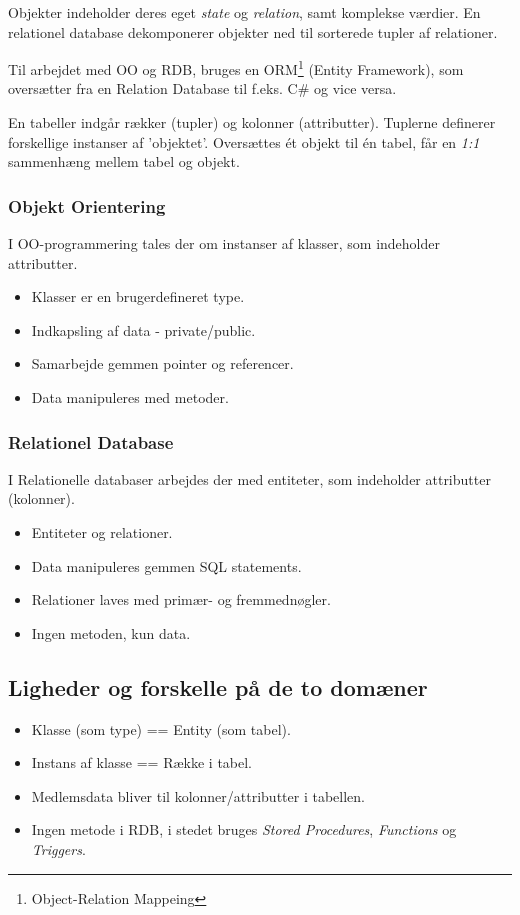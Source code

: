 Objekter indeholder deres eget \textit{state} og \textit{relation}, samt komplekse værdier. En relationel database dekomponerer objekter ned til sorterede tupler af relationer.

Til arbejdet med OO og RDB, bruges en ORM\footnote{Object-Relation Mappeing} (Entity Framework), som oversætter fra en Relation Database til f.eks. C\# og vice versa.

En tabeller indgår rækker (tupler) og kolonner (attributter). 
Tuplerne definerer forskellige instanser af 'objektet'. Oversættes ét objekt til én tabel, får en \textit{1:1} sammenhæng mellem tabel og objekt.

\subsubsection{Objekt Orientering}
I OO-programmering tales der om instanser af klasser, som indeholder attributter.

\begin{itemize}
	\item Klasser er en brugerdefineret type.
	\item Indkapsling af data - private/public.
	\item Samarbejde gemmen pointer og referencer.
	\item Data manipuleres med metoder.
\end{itemize}

\subsubsection{Relationel Database}
I Relationelle databaser arbejdes der med entiteter, som indeholder attributter (kolonner).

\begin{itemize}
	\item Entiteter og relationer.
	\item Data manipuleres gemmen SQL statements.
	\item Relationer laves med primær- og fremmednøgler.
	\item Ingen metoden, kun data.
\end{itemize}

\subsection{Ligheder og forskelle på de to domæner}

\begin{itemize}
	\item Klasse (som type) == Entity (som tabel). 
	\item Instans af klasse == Række i tabel.
	\item Medlemsdata bliver til kolonner/attributter i tabellen.
	\item Ingen metode i RDB, i stedet bruges \textit{Stored Procedures}, \textit{Functions} og \textit{Triggers}.
\end{itemize}

